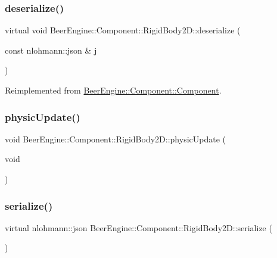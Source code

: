 \subsubsection{\texorpdfstring{deserialize()}{deserialize()}}
{\footnotesize\ttfamily virtual void Beer\+Engine\+::\+Component\+::\+Rigid\+Body2\+D\+::deserialize (\begin{DoxyParamCaption}\item[{const nlohmann\+::json \&}]{j }\end{DoxyParamCaption})\hspace{0.3cm}{\ttfamily [virtual]}}



Reimplemented from \mbox{\hyperlink{class_beer_engine_1_1_component_1_1_component_a044d30f65879a1467f44aa3eb8ad7bce}{Beer\+Engine\+::\+Component\+::\+Component}}.

\mbox{\label{class_beer_engine_1_1_component_1_1_rigid_body2_d_ab452ad926f43ec0cb06ace5f187d8efd}} 
\subsubsection{\texorpdfstring{physic\+Update()}{physicUpdate()}}
{\footnotesize\ttfamily void Beer\+Engine\+::\+Component\+::\+Rigid\+Body2\+D\+::physic\+Update (\begin{DoxyParamCaption}\item[{void}]{ }\end{DoxyParamCaption})}

\mbox{\label{class_beer_engine_1_1_component_1_1_rigid_body2_d_afd6b6d4073e564a1c536243027bb8597}} 
\subsubsection{\texorpdfstring{serialize()}{serialize()}}
{\footnotesize\ttfamily virtual nlohmann\+::json Beer\+Engine\+::\+Component\+::\+Rigid\+Body2\+D\+::serialize (\begin{DoxyParamCaption}{ }\end{DoxyParamCaption})\hspace{0.3cm}{\ttfamily [virtual]}}



